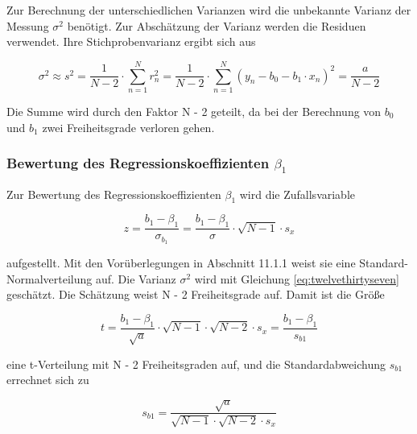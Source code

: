 \noindent Zur Berechnung der unterschiedlichen Varianzen wird die unbekannte Varianz der Messung $\sigma^{2}$ ben\"{o}tigt. Zur Absch\"{a}tzung der Varianz werden die Residuen verwendet. Ihre Stichprobenvarianz ergibt sich aus 

\begin{equation}\label{eq:twelvethirtyseven}
\sigma ^{2} \approx s^{2} =\dfrac{1}{N-2} \cdot \sum _{n=1}^{N}r_{n}^{2}  =\dfrac{1}{N-2} \cdot \sum _{n=1}^{N}\left(y_{n} -b_{0} -b_{1} \cdot x_{n} \right)^{2}  =\dfrac{a}{N-2}
\end{equation}

\noindent Die Summe wird durch den Faktor N - 2 geteilt, da bei der Berechnung von $b_{0}$ und $b_{1}$ zwei Freiheitsgrade verloren gehen. 

\clearpage

\subsubsection{Bewertung des Regressionskoeffizienten \texorpdfstring{$\beta_{1}$}{Lg}}

\noindent Zur Bewertung des Regressionskoeffizienten $\beta_{1}$ wird die Zufallsvariable

\begin{equation}\label{eq:twelvethirtyeight}
z=\dfrac{b_{1} -\beta _{1}}{\sigma _{b_{1}}} =\dfrac{b_{1} -\beta _{1}}{\sigma} \cdot \sqrt{N-1} \cdot s_{x}
\end{equation}

\noindent aufgestellt. Mit den Vor\"{u}berlegungen in Abschnitt 11.1.1 weist sie eine Standard-Normalverteilung auf. Die Varianz $\sigma^{2}$ wird mit Gleichung \eqref{eq:twelvethirtyseven} gesch\"{a}tzt. Die Sch\"{a}tzung weist N - 2 Freiheitsgrade auf. Damit ist die Gr\"{o}{\ss}e 


\begin{equation}\label{eq:twelvethirtynine}
t=\dfrac{b_{1} -\beta _{1}}{\sqrt{a}} \cdot \sqrt{N-1} \cdot \sqrt{N-2} \cdot s_{x} =\dfrac{b_{1} -\beta _{1} }{s_{b1}}
\end{equation}

\noindent eine t-Verteilung mit N - 2 Freiheitsgraden auf, und die Standardabweichung $s_{b1}$ errechnet sich zu

\begin{equation}\label{eq:twelvefourty}
s_{b1} =\dfrac{\sqrt{a}}{\sqrt{N-1} \cdot \sqrt{N-2} \cdot s_{x}}
\end{equation}\bigskip

